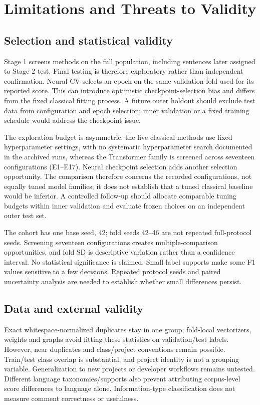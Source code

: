 \section{Limitations and Threats to Validity}\label{sec:validity}
\subsection{Selection and statistical validity}
Stage 1 screens methods on the full population, including sentences later assigned to Stage 2 test. Final testing is therefore exploratory rather than independent confirmation. Neural CV selects an epoch on the same validation fold used for its reported score. This can introduce optimistic checkpoint-selection bias and differs from the fixed classical fitting process. A future outer holdout should exclude test data from configuration and epoch selection; inner validation or a fixed training schedule would address the checkpoint issue.

The exploration budget is asymmetric: the five classical methods use fixed hyperparameter settings, with no systematic hyperparameter search documented in the archived runs, whereas the Transformer family is screened across seventeen configurations (E1--E17). Neural checkpoint selection adds another selection opportunity. The comparison therefore concerns the recorded configurations, not equally tuned model families; it does not establish that a tuned classical baseline would be inferior. A controlled follow-up should allocate comparable tuning budgets within inner validation and evaluate frozen choices on an independent outer test set.

The cohort has one base seed, 42; fold seeds 42--46 are not repeated full-protocol seeds. Screening seventeen configurations creates multiple-comparison opportunities, and fold SD is descriptive variation rather than a confidence interval. No statistical significance is claimed. Small label supports make some F1 values sensitive to a few decisions. Repeated protocol seeds and paired uncertainty analysis are needed to establish whether small differences persist.

\subsection{Data and external validity}
Exact whitespace-normalized duplicates stay in one group; fold-local vectorizers, weights and graphs avoid fitting these statistics on validation/test labels. However, near duplicates and class/project conventions remain possible. Train/test class overlap is substantial, and project identity is not a grouping variable. Generalization to new projects or developer workflows remains untested. Different language taxonomies/supports also prevent attributing corpus-level score differences to language alone. Information-type classification does not measure comment correctness or usefulness.


